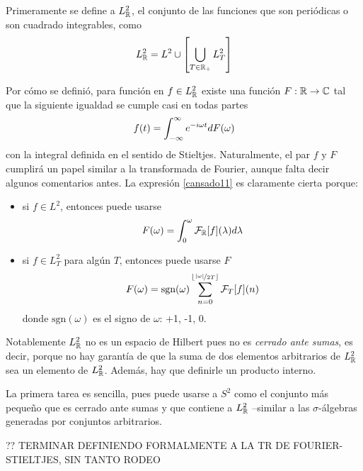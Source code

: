 Primeramente se define a $L^{2}_{\mathbb{R}}$, el conjunto de las funciones que son periódicas o son cuadrado integrables, como
\begin{equation}
L^{2}_{\mathbb{R}} = L^{2} \cup \left[ \bigcup_{T\in \mathbb{R}_+} L^{2}_T \right]
\end{equation}

Por cómo se definió, para función en $f \in L^{2}_{\mathbb{R}}$ existe una función $F: \mathbb{R} \rightarrow \mathbb{C}$ tal que la siguiente igualdad se cumple casi en todas partes
\begin{equation}
f(t) = \int_{-\infty}^{\infty} e^{-i \omega t} dF(\omega)
\label{cansado11}
\end{equation}
con la integral definida en el sentido de Stieltjes.
%
Naturalmente, el par $f$ y $F$ cumplirá un papel similar a la transformada de Fourier, aunque falta decir algunos comentarios antes.
%
La expresión \ref{cansado11} es claramente cierta porque:
\begin{itemize}
\item si $f \in L^{2}$, entonces puede usarse 
\begin{equation*}
F(\omega)=\int_{0}^{\omega} \mathcal{F}_{\mathbb{R}}[f](\lambda) d\lambda
\end{equation*}
\item si $f \in L^{2}_T$ para algún $T$, entonces puede usarse $F$
\begin{equation*}
F(\omega) =  \text{sgn}(\omega) \sum_{n = 0}^{\left\lfloor \nicefrac{\left| \omega \right|}{2T} \right\rfloor} \mathcal{F}_T[f](n)
\end{equation*}
donde $\text{sgn}(\omega)$ es el signo de $\omega$: +1, -1, 0. 
\end{itemize}

Notablemente $L^{2}_{\mathbb{R}}$ no es un espacio de Hilbert pues no es \textit{cerrado ante sumas}, es decir, porque no hay garantía de que la suma de dos elementos arbitrarios de $L^{2}_{\mathbb{R}}$ sea un elemento de $L^{2}_{\mathbb{R}}$.
%
Además, hay que definirle un producto interno.

La primera tarea es sencilla, pues puede usarse a $S^{2}$ como el conjunto más pequeño que es cerrado ante sumas y que contiene a $L^{2}_{\mathbb{R}}$ --similar a las $\sigma$-álgebras generadas por conjuntos arbitrarios.
%

?? TERMINAR DEFINIENDO FORMALMENTE A LA TR DE FOURIER-STIELTJES, SIN TANTO RODEO

